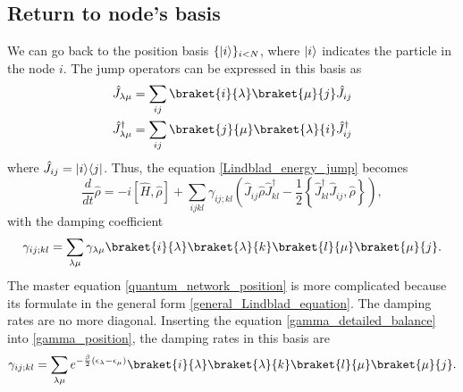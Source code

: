 \subsection{Return to node's basis}
We can go back to the position basis $\{\lvert i\rangle\}_{i<N}$, where $\lvert i\rangle$ indicates the particle in the node $i$.  
The jump operators can be expressed in this basis as
\begin{align}
    \hat J_{\lambda\mu} = \sum_{ij} \braket{i}{\lambda}\braket{\mu}{j}\hat J_{ij}\\
    \hat J_{\lambda\mu}^\dagger = \sum_{ij} \braket{j}{\mu}\braket{\lambda}{i}\hat J_{ij}^\dagger
\end{align}
where $\hat J_{ij} = \lvert i\rangle\langle j\rvert$.
Thus, the equation \eqref{Lindblad_energy_jump} becomes
\begin{equation}\label{quantum_network_position}
    \frac{d}{dt}\hat\rho = -i\left[\hat H,\hat\rho\right] +\sum_{ijkl} \gamma_{ij;kl} \left(\hat J_{ij}\hat\rho \hat J_{kl}^\dagger - \frac{1}{2}\left\{ \hat J_{kl}^\dagger\hat J_{ij}, \hat\rho\right\} \right),
\end{equation}
with the damping coefficient
\begin{equation}\label{gamma_position}
    \gamma_{ij;kl}= \sum_{\lambda\mu}\gamma_{\lambda\mu}\braket{i}{\lambda}\braket{\lambda}{k}\braket{l}{\mu}\braket{\mu}{j}.
\end{equation}
The master equation \eqref{quantum_network_position} is more complicated because its formulate in the general form \eqref{general_Lindblad_equation}. The damping rates are no more diagonal.
Inserting the equation \eqref{gamma_detailed_balance} into \eqref{gamma_position}, the damping rates in this basis are
\begin{equation}
    \gamma_{ij;kl}= \sum_{\lambda\mu}e^{-\frac{\beta}{2}\left(\epsilon_\lambda - \epsilon_\mu\right)}\braket{i}{\lambda}\braket{\lambda}{k}\braket{l}{\mu}\braket{\mu}{j}.
\end{equation}
